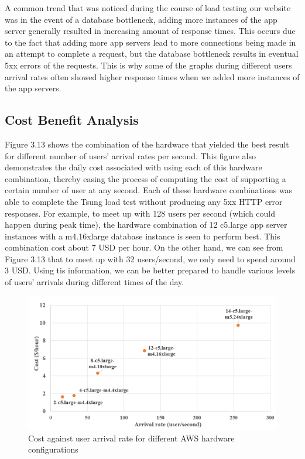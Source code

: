 A common trend that was noticed during the course of load testing our website was in the event of a database bottleneck, adding more instances of the app server generally resulted in increasing amount of response times. This occurs due to the fact that adding more app servers lead to more connections being made in an attempt to complete a request, but the database bottleneck results in eventual 5xx errors of the requests. This is why some of the graphs during different users arrival rates often showed higher response times when we added more instances of the app servers. 
\subsection {Cost Benefit Analysis}

Figure 3.13 shows the combination of the hardware that yielded the best result for different number of users' arrival rates per second. This figure also demonstrates the daily cost associated with using each of this hardware combination, thereby easing the process of computing the cost of supporting a certain number of user at any second. Each of these hardware combinations was able to complete the Tsung load test without producing any 5xx HTTP error responses. For example, to meet up with 128 users per second (which could happen during peak time), the hardware combination of 12 c5.large app server instances with a m4.16xlarge database instance is seen to perform best. This combination cost about 7 USD per hour. On the other hand, we can see from Figure 3.13 that to meet up with 32 users/second, we only need to spend around 3 USD. Using tis information, we can be better prepared to handle various levels of users' arrivals during different times of the day.
\begin{figure}[h]
	\centering
	\includegraphics[width=1\textwidth]{images/cost.PNG}
	\caption{Cost against user arrival rate for different AWS hardware configurations}\label{fig:sqlopt}
\end{figure}


